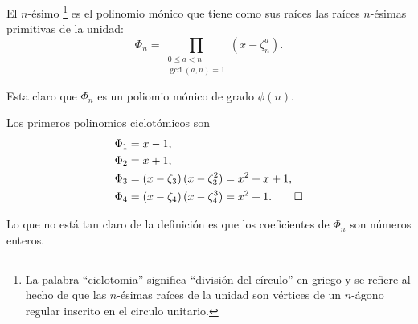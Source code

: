 \begin{definicion}
  El $n$-ésimo \footnote{La palabra ``ciclotomia''
    significa ``división del círculo'' en griego y se refiere al hecho de que
    las $n$-ésimas raíces de la unidad son vértices de un $n$-ágono regular
    inscrito en el circulo unitario.} es el polinomio mónico que tiene como sus
  raíces las raíces $n$-ésimas primitivas de la unidad:
  $$\Phi_n = \prod_{\substack{0 \le a < n \\ \gcd (a,n) = 1}} (x - \zeta_n^a).$$
\end{definicion}

Esta claro que $\Phi_n$ es un poliomio mónico de grado $\phi (n)$.

\begin{ejemplo}
  Los primeros polinomios ciclotómicos son
  \begin{align*}
    \Phi_1 & = x - 1,\\
    \Phi_2 & = x + 1,\\
    \Phi_3 & = (x - \zeta_3)\,(x - \zeta_3^2) = x^2 + x + 1,\\
    \Phi_4 & = (x - \zeta_4)\,(x - \zeta_4^3) = x^2 + 1. \qedhere
  \end{align*}
\end{ejemplo}

Lo que no está tan claro de la definición es que los coeficientes de $\Phi_n$
son números enteros.

